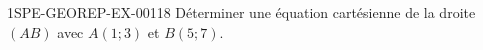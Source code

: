\begin{exercice}{1SPE-GEOREP-EX-001}{1}{8}
Déterminer une équation cartésienne de la droite $(AB)$ avec $A(1 ; 3)$ et $B(5 ; 7)$.
\end{exercice}
